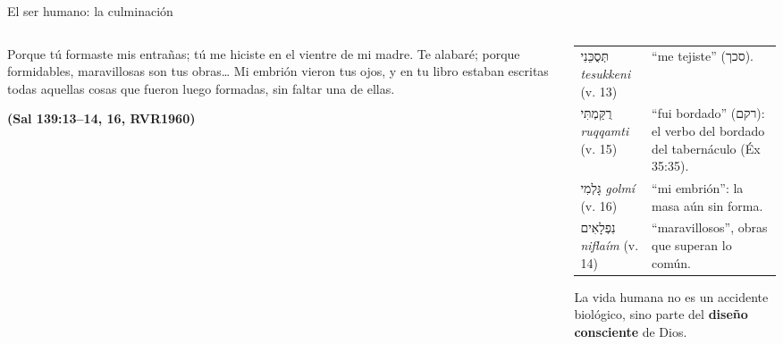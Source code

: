 \documentclass[hyperref={bookmarks=false},aspectratio=169]{beamer}
\newcommand{\heb}[1]{\mbox{\foreignlanguage{hebrew}{#1}}}
\newcommand{\fuente}[1]{\par\hfill{\upshape\bfseries\footnotesize\textcolor{azul}{#1}}}
\newcommand{\destacar}[1]{\textbf{\textcolor{azul}{#1}}}
\begin{document}
\begin{frame}{El ser humano: la culminación}
\begin{columns}[c,onlytextwidth]
\begin{column}{0.50\textwidth}
\begin{cita}Porque tú formaste mis entrañas; tú me hiciste en el vientre de mi madre. Te alabaré; porque formidables, maravillosas son tus obras\ldots{} Mi embrión vieron tus ojos, y en tu libro estaban escritas todas aquellas cosas que fueron luego formadas, sin faltar una de ellas.\fuente{(Sal 139:13--14, 16, RVR1960)}\end{cita}
\end{column}
\begin{column}{0.48\textwidth}
\scriptsize\renewcommand{\arraystretch}{1.15}
\begin{tabular}{@{}>{\RaggedRight\arraybackslash}p{2.1cm}>{\RaggedRight\arraybackslash}p{3.3cm}@{}}
\toprule
\heb{תְּסֻכֵּנִי} \emph{tesukkeni} (v. 13) & ``me tejiste'' (\heb{סכך}). \\
\heb{רֻקַּמְתִּי} \emph{ruqqamti} (v. 15) & ``fui bordado'' (\heb{רקם}): el verbo del bordado del tabernáculo (Éx 35:35). \\
\heb{גָּלְמִי} \emph{golmí} (v. 16) & ``mi embrión'': la masa aún sin forma. \\
\heb{נִפְלָאִים} \emph{niflaím} (v. 14) & ``maravillosos'', obras que superan lo común. \\
\bottomrule
\end{tabular}\par\medskip
\small\RaggedRight La vida humana no es un accidente biológico, sino parte del \destacar{diseño consciente} de Dios.
\end{column}
\end{columns}
\end{frame}
\end{document}
